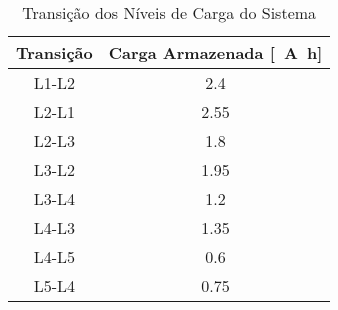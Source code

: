 \begin{table}[!htpb]
\centering
\begin{tabular}{c c}
\\ \hline
Transição & Carga Armazenada [\SI{}{\ampere\hour}] \\ \hline \hline
L1-L2 & 2.4 \\
L2-L1 & 2.55 \\
L2-L3 & 1.8 \\
L3-L2 & 1.95 \\
L3-L4 & 1.2 \\
L4-L3 & 1.35 \\
L4-L5 & 0.6 \\
L5-L4 & 0.75 \\ \hline
\end{tabular}
\caption{Transição dos Níveis de Carga do Sistema}
\label{niveis_energia}
\end{table}